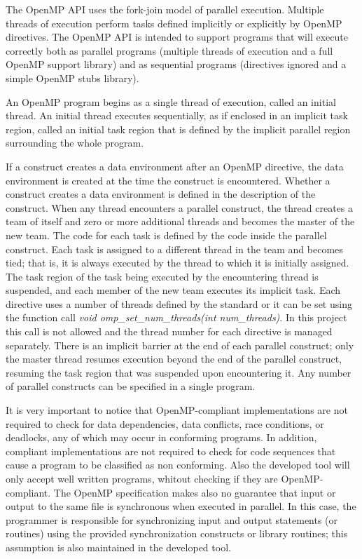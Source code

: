 \documentclass[a4paper,12pt,oneside]{book}
\begin{document}
The OpenMP API uses the fork-join model of parallel execution. Multiple threads of execution perform tasks defined implicitly or explicitly by OpenMP directives. The OpenMP API is intended to support programs that will execute correctly both as parallel programs (multiple threads of execution and a full OpenMP support library) and as sequential programs (directives ignored and a simple OpenMP stubs library).

An OpenMP program begins as a single thread of execution, called an initial thread. An initial thread executes sequentially, as if enclosed in an implicit task region, called an initial task region that is defined by the implicit parallel region surrounding the whole program.

If a construct creates a data environment after an OpenMP directive, the data environment is created at the time the construct is encountered. Whether a construct creates a data environment is defined in the description of the construct. When any thread encounters a parallel construct, the thread creates a team of itself and zero or more additional threads and becomes the master of the new team. The code for each task is defined by the code inside the parallel construct. Each task is assigned to a different thread in the team and becomes tied; that is, it is always executed by the thread to which it is initially assigned. The task region of the task being executed by the encountering thread is suspended, and each member of the new team executes its implicit task. Each directive uses a number of threads defined by the standard or it can be set using the function call \emph{void omp\_set\_num\_threads(int num\_threads)}. In this project this call is not allowed and the thread number for each directive is managed separately. There is an implicit barrier at the end of each parallel construct; only the master thread resumes execution beyond the end of the parallel construct, resuming the task region that was suspended upon encountering it. Any number of parallel constructs can be specified in a single program. 

It is very important to notice that OpenMP-compliant implementations are not required to check for data dependencies, data conflicts, race conditions, or deadlocks, any of which may occur in conforming programs. In addition, compliant implementations are not required to check for code sequences that cause a program to be classified as non conforming. Also the developed tool will only accept well written programs, whitout checking if they are OpenMP-compliant. The OpenMP specification makes also no guarantee that input or output to the same file is synchronous when executed in parallel. In this case, the programmer is responsible for synchronizing input and output statements (or routines) using the provided synchronization constructs or library routines; this assumption is also maintained in the developed tool.
\end{document}

